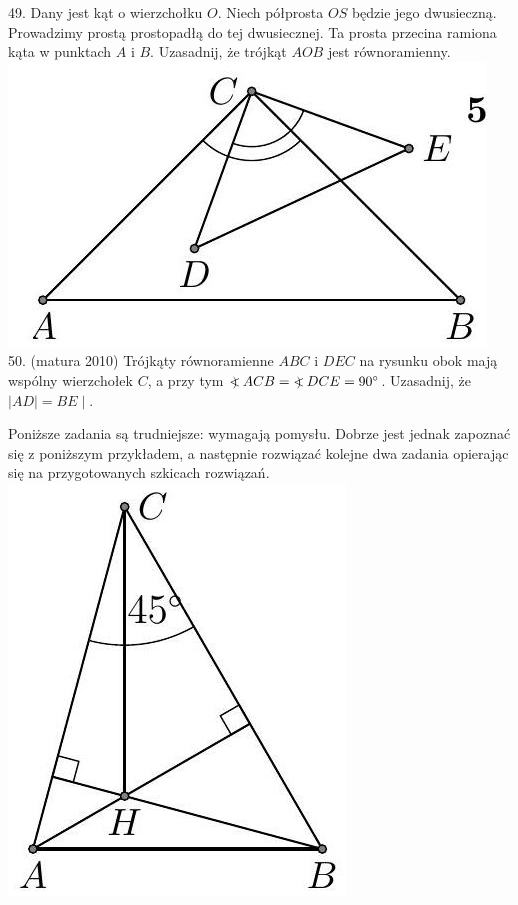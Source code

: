 \documentclass[10pt]{article}
\newcommand\Varangle{\mathop{{<\!\!\!\!\!\text{\small)}}\:}\nolimits}
\begin{document}
49. Dany jest kąt o wierzchołku \(O\). Niech półprosta \(O S\) będzie jego dwusieczną. Prowadzimy prostą prostopadłą do tej dwusiecznej. Ta prosta przecina ramiona kąta w punktach \(A\) i \(B\). Uzasadnij, że trójkąt \(A O B\) jest równoramienny.\\
\includegraphics[max width=\textwidth, center]{2024_11_21_71f62bd117d375398909g-054}\\
50. (matura 2010) Trójkąty równoramienne \(A B C\) i \(D E C\) na rysunku obok mają wspólny wierzchołek \(C\), a przy tym \(\Varangle A C B=\Varangle D C E=90^{\circ}\). Uzasadnij, że \(|A D|=B E \mid\).

Poniższe zadania są trudniejsze: wymagają pomysłu. Dobrze jest jednak zapoznać się z poniższym przykładem, a następnie rozwiązać kolejne dwa zadania opierając się na przygotowanych szkicach rozwiązań.\\
\includegraphics[max width=\textwidth, center]{2024_11_21_71f62bd117d375398909g-055(1)}
\end{document}

